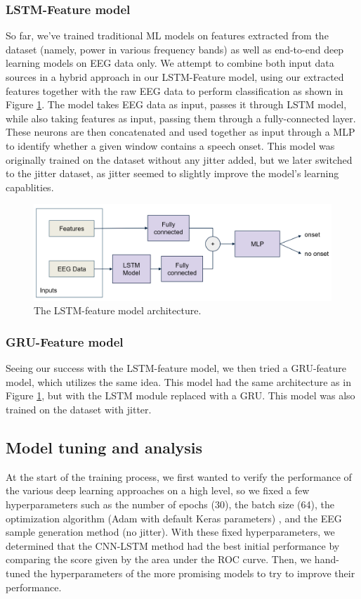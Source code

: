 \documentclass[format=sigconf, nonacm=true, review=true, screen=true]{acmart}
\begin{document}
\subsubsection{LSTM-Feature model}
So far, we've trained traditional ML models on features extracted from the dataset (namely, power in various frequency bands) as well as end-to-end deep learning models on EEG data only. We attempt to combine both input data sources in a hybrid approach in our LSTM-Feature model, using our extracted features together with the raw EEG data to perform classification as shown in Figure \ref{fig:lstm_feature_model}. The model takes EEG data as input, passes it through LSTM model, while also taking features as input, passing them through a fully-connected layer. These neurons are then concatenated and used together as input through a MLP to identify whether a given window contains a speech onset. This model was originally trained on the dataset without any jitter added, but we later switched to the jitter dataset, as jitter seemed to slightly improve the model's learning capablities.

\begin{figure}[H]
    \centering
    \includegraphics[width=\columnwidth]{figures/lstm-feature-model.png}
    \caption{The LSTM-feature model architecture.}
    \label{fig:lstm_feature_model}
\end{figure}

\subsubsection{GRU-Feature model}
Seeing our success with the LSTM-feature model, we then tried a GRU-feature model, which utilizes the same idea. This model had the same architecture as in Figure \ref{fig:lstm_feature_model}, but with the LSTM module replaced with a GRU. This model was also trained on the dataset with jitter.

\subsection{Model tuning and analysis} \label{sec:modeltraining}
At the start of the training process, we first wanted to verify the performance of the various deep learning approaches on a high level, so we fixed a few hyperparameters such as the number of epochs (30), the batch size (64), the optimization algorithm (Adam with default Keras parameters) \cite{adamoptimizer, chollet2015keras}, and the EEG sample generation method (no jitter). With these fixed hyperparameters, we determined that the CNN-LSTM method had the best initial performance by comparing the score given by the area under the ROC curve. Then, we hand-tuned the hyperparameters of the more promising models to try to improve their performance.
\end{document}
